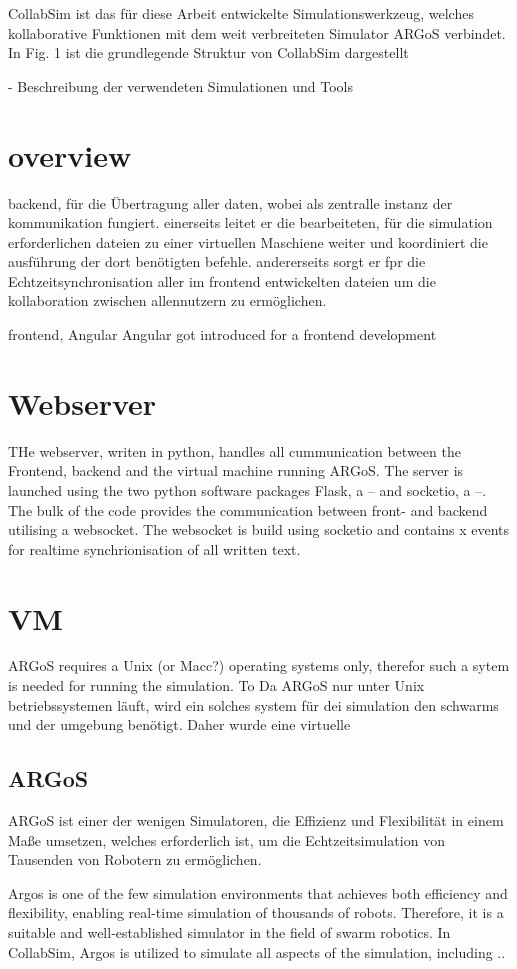 \documentclass[german,version-2020-11]{uzl-thesis}
\begin{document}
CollabSim ist das für diese Arbeit entwickelte Simulationswerkzeug, welches kollaborative Funktionen mit dem weit verbreiteten Simulator ARGoS verbindet. 
In Fig. 1 ist die grundlegende Struktur von CollabSim dargestellt


- Beschreibung der verwendeten Simulationen und Tools
\section{overview}
backend, für die Übertragung aller daten, wobei als zentralle instanz der kommunikation fungiert. 
einerseits leitet er die bearbeiteten, für die simulation erforderlichen dateien zu einer virtuellen Maschiene weiter und koordiniert die ausführung der dort benötigten befehle. 
andererseits sorgt er fpr die Echtzeitsynchronisation aller im frontend entwickelten dateien um die kollaboration zwischen allennutzern zu ermöglichen.

frontend, Angular
Angular got introduced for a frontend development

\section{Webserver}
THe webserver, writen in python, handles all cummunication between the Frontend, backend and the virtual machine running ARGoS. 
The server is launched using the two python software packages Flask, a -- and socketio, a --.
The bulk of the code provides the communication between front- and backend utilising a websocket. 
The websocket is build using socketio and contains x events for realtime synchrionisation of all written text.
\section{VM}
ARGoS requires a Unix (or Macc?) operating systems only, therefor such a sytem is needed for running the simulation. To 
Da ARGoS nur unter Unix betriebssystemen läuft, wird ein solches system für dei simulation den schwarms und der umgebung benötigt. Daher wurde eine virtuelle
\subsection{ARGoS}
  ARGoS ist einer der wenigen Simulatoren, die Effizienz und Flexibilität in einem Maße umsetzen, welches erforderlich ist, 
  um die Echtzeitsimulation von Tausenden von Robotern zu ermöglichen.

  Argos is one of the few simulation environments that achieves both efficiency and flexibility, 
  enabling real-time simulation of thousands of robots. Therefore, it is a suitable and well-established simulator in the field of swarm robotics.
  In CollabSim, Argos is utilized to simulate all aspects of the simulation, including ..
\end{document}
